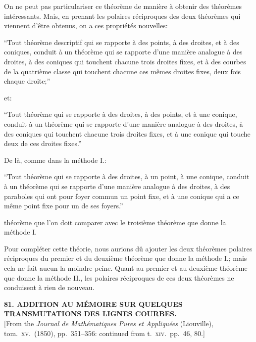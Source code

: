 \documentclass[11pt]{article}
\begin{document}
On ne peut pas particulariser ce th\'eor\`eme de mani\`ere \`a obtenir des th\'eor\`emes int\'eressants. Mais, en prenant les polaires r\'eciproques des deux th\'eor\`emes qui viennent d'\^etre obtenus, on a ces propri\'et\'es nouvelles:

``Tout th\'eor\`eme descriptif qui se rapporte \`a des points, \`a des droites, et \`a des coniques, conduit \`a un th\'eor\`eme qui se rapporte d'une mani\`ere analogue \`a des droites, \`a des coniques qui touchent chacune trois droites fixes, et \`a des courbes de la quatri\`eme classe qui touchent chacune ces m\^emes droites fixes, deux fois chaque droite;''

et:

``Tout th\'eor\`eme qui se rapporte \`a des droites, \`a des points, et \`a une conique, conduit \`a un th\'eor\`eme qui se rapporte d'une mani\`ere analogue \`a des droites, \`a des coniques qui touchent chacune trois droites fixes, et \`a une conique qui touche deux de ces droites fixes.''

De l\`a, comme dans la m\'ethode I.:

``Tout th\'eor\`eme qui se rapporte \`a des droites, \`a un point, \`a une conique, conduit \`a un th\'eor\`eme qui se rapporte d'une mani\`ere analogue \`a des droites, \`a des paraboles qui ont pour foyer commun un point fixe, et \`a une conique qui a ce m\^eme point fixe pour un de ses foyers.''

th\'eor\`eme que l'on doit comparer avec le troisi\`eme th\'eor\`eme que donne la m\'ethode I.

Pour compl\'eter cette th\'eorie, nous aurions d\^u ajouter les deux th\'eor\`emes polaires r\'eciproques du premier et du deuxi\`eme th\'eor\`eme que donne la m\'ethode I.; mais cela ne fait aucun la moindre peine. Quant au premier et au deuxi\`eme th\'eor\`eme que donne la m\'ethode II., les polaires r\'eciproques de ces deux th\'eor\`emes ne conduisent \`a rien de nouveau.

\bigskip
\begin{center}
\textbf{81. ADDITION AU M\'EMOIRE SUR QUELQUES TRANSMUTATIONS DES LIGNES COURBES.}\\[2pt]
[From the \textit{Journal de Math\'ematiques Pures et Appliqu\'ees} (Liouville), tom.~\textsc{xv}.\ (1850), pp.~351--356: continued from t.~\textsc{xiv}.\ pp.~46, 80.]
\end{center}
\end{document}
